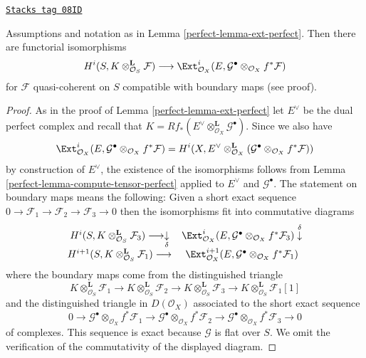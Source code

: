 \begin{lemma}
\label{perfect-lemma-compute-ext-perfect}
\href{https://stacks.math.columbia.edu/tag/08ID}{\texttt{Stacks tag 08ID}}

Assumptions and notation as in Lemma \ref{perfect-lemma-ext-perfect}.
Then there are functorial isomorphisms
$$
H^i(S, K \otimes^\mathbf{L}_{\mathcal{O}_S} \mathcal{F})
\longrightarrow
\Ext^i_{\mathcal{O}_X}(E,
\mathcal{G}^\bullet \otimes_{\mathcal{O}_X} f^*\mathcal{F})
$$
for $\mathcal{F}$ quasi-coherent on $S$
compatible with boundary maps (see proof).
\end{lemma}

\begin{proof}

As in the proof of Lemma \ref{perfect-lemma-ext-perfect} let $E^\vee$ be the
dual perfect complex and recall that
$K = Rf_*(E^\vee \otimes_{\mathcal{O}_X}^\mathbf{L} \mathcal{G}^\bullet)$.
Since we also have
$$
\Ext^i_{\mathcal{O}_X}(E,
\mathcal{G}^\bullet \otimes_{\mathcal{O}_X} f^*\mathcal{F})
=
H^i(X, E^\vee \otimes^\mathbf{L}_{\mathcal{O}_X}
(\mathcal{G}^\bullet \otimes_{\mathcal{O}_X} f^*\mathcal{F}))
$$
by construction of $E^\vee$, the existence of the isomorphisms follows
from Lemma \ref{perfect-lemma-compute-tensor-perfect} applied to $E^\vee$
and $\mathcal{G}^\bullet$.
The statement on boundary maps means the following: Given a short
exact sequence $0 \to \mathcal{F}_1 \to \mathcal{F}_2 \to \mathcal{F}_3 \to 0$
then the isomorphisms fit into commutative diagrams
$$
\begin{array}{cc}H^i(S, K \otimes^\mathbf{L}_{\mathcal{O}_S} \mathcal{F}_3)
\longrightarrow\underset{\delta}{\downarrow} & \Ext^i_{\mathcal{O}_X}(E,
\mathcal{G}^\bullet \otimes_{\mathcal{O}_X} f^*\mathcal{F}_3) \overset{\delta}{\downarrow} \\ H^{i + 1}(S, K \otimes^\mathbf{L}_{\mathcal{O}_S} \mathcal{F}_1)
\longrightarrow & \Ext^{i + 1}_{\mathcal{O}_X}(E,
\mathcal{G}^\bullet \otimes_{\mathcal{O}_X} f^*\mathcal{F}_1)\end{array}
$$
where the boundary maps come from the distinguished triangle
$$
K \otimes^\mathbf{L}_{\mathcal{O}_S} \mathcal{F}_1 \to
K \otimes^\mathbf{L}_{\mathcal{O}_S} \mathcal{F}_2 \to
K \otimes^\mathbf{L}_{\mathcal{O}_S} \mathcal{F}_3 \to
K \otimes^\mathbf{L}_{\mathcal{O}_S} \mathcal{F}_1[1]
$$
and the distinguished triangle in $D(\mathcal{O}_X)$ associated to
the short exact sequence
$$
0 \to
\mathcal{G}^\bullet \otimes_{\mathcal{O}_X} f^*\mathcal{F}_1 \to
\mathcal{G}^\bullet \otimes_{\mathcal{O}_X} f^*\mathcal{F}_2 \to
\mathcal{G}^\bullet \otimes_{\mathcal{O}_X} f^*\mathcal{F}_3 \to 0
$$
of complexes.
This sequence is exact because $\mathcal{G}$ is flat over $S$.
We omit the verification of the commutativity of the displayed diagram.
\end{proof}

